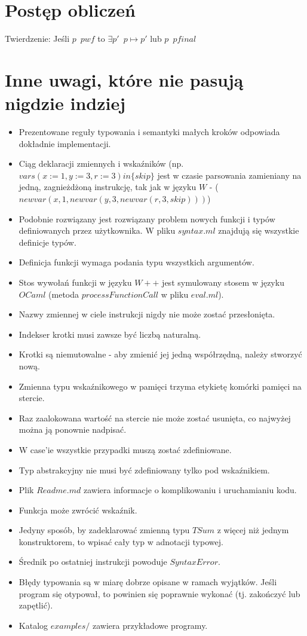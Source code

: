 \documentclass{article}
\begin{document}
\section{Postęp obliczeń}
\Large{Twierdzenie: Jeśli $p \enspace pwf$ to $\exists{p'} \enspace p \mapsto p'$ lub $p \enspace pfinal $}

\normalsize{}

\section{Inne uwagi, które nie pasują nigdzie indziej}
\begin{itemize}
    \item Prezentowane reguły typowania i semantyki małych kroków odpowiada dokładnie implementacji.
    \item Ciąg deklaracji zmiennych i wskaźników (np. $vars(x:= 1, y:= 3, r:= 3) in \{skip\}$ jest w czasie parsowania zamieniany na jedną, zagnieżdżoną instrukcję, tak jak w języku $W$ - ($newvar(x, 1, newvar(y, 3, newvar(r, 3, skip))) $)
    \item Podobnie rozwiązany jest rozwiązany problem nowych funkcji i typów definiowanych przez użytkownika. W pliku $syntax.ml$ znajdują się wszystkie definicje typów.
    \item Definicja funkcji wymaga podania typu wszystkich argumentów.
    \item Stos wywołań funkcji w języku $W++$ jest symulowany stosem w języku $OCaml$ (metoda $processFunctionCall$ w pliku $eval.ml$). 
    \item Nazwy zmiennej w ciele instrukcji nigdy nie może zostać przesłonięta.
    \item Indekser krotki musi zawsze być liczbą naturalną.
    \item Krotki są niemutowalne - aby zmienić jej jedną współrzędną, należy stworzyć nową.
    \item Zmienna typu wskaźnikowego w pamięci trzyma etykietę komórki pamięci na stercie.
    \item Raz zaalokowana wartość na stercie nie może zostać usunięta, co najwyżej można ją ponownie nadpisać.
    \item W case'ie wszystkie przypadki muszą zostać zdefiniowane.
    \item Typ abstrakcyjny nie musi być zdefiniowany tylko pod wskaźnikiem.
    \item Plik $Readme.md$ zawiera informacje o komplikowaniu i uruchamianiu kodu.
    \item Funkcja może zwrócić wskaźnik.
    \item Jedyny sposób, by zadeklarować zmienną typu $TSum$ z więcej niż jednym konstruktorem, to wpisać cały typ w adnotacji typowej.
    \item Średnik po ostatniej instrukcji powoduje $SyntaxError$.
    \item Błędy typowania są w miarę dobrze opisane w ramach wyjątków. Jeśli program się otypował, to powinien się poprawnie wykonać (tj. zakończyć lub zapętlić).
    \item Katalog $examples/$ zawiera przykładowe programy.
    
\end{itemize}
\end{document}
